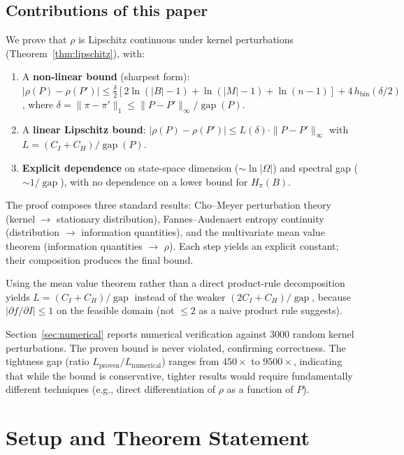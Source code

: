 \documentclass[11pt,a4paper]{article}
\DeclareMathOperator{\gap}{gap}
\begin{document}
\subsection{Contributions of this paper}

We prove that $\rho$ is Lipschitz continuous under kernel perturbations
(Theorem~\ref{thm:lipschitz}), with:
\begin{enumerate}
  \item A \textbf{non-linear bound} (sharpest form):
    $|\rho(P) - \rho(P')| \le
    \frac{\delta}{2}[2\ln(|B|-1) + \ln(|M|-1) + \ln(n-1)]
    + 4\,h_{\mathrm{bin}}(\delta/2)$,
    where $\delta = \|\pi - \pi'\|_1 \le \|P-P'\|_\infty/\gap(P)$.
  \item A \textbf{linear Lipschitz bound}:
    $|\rho(P) - \rho(P')| \le L(\delta)\cdot\|P-P'\|_\infty$
    with $L = (C_I + C_H)/\gap(P)$.
  \item \textbf{Explicit dependence} on state-space dimension
    ($\sim\ln|\Omega|$) and spectral gap ($\sim 1/\gap$), with
    no dependence on a lower bound for $H_\pi(B)$.
\end{enumerate}

The proof composes three standard results: Cho--Meyer perturbation
theory~\cite{ChoMeyer2001} (kernel $\to$ stationary distribution),
Fannes--Audenaert entropy continuity~\cite{Audenaert2007} (distribution
$\to$ information quantities), and the multivariate mean value theorem
(information quantities $\to$ $\rho$).  Each step yields an explicit
constant; their composition produces the final bound.

Using the mean value theorem rather than a direct product-rule
decomposition yields $L = (C_I + C_H)/\gap$ instead of the weaker
$(2C_I + C_H)/\gap$, because $|\partial f/\partial I| \le 1$ on the
feasible domain (not $\le 2$ as a naive product rule suggests).

Section~\ref{sec:numerical} reports numerical verification against
3000 random kernel perturbations.  The proven bound is never violated,
confirming correctness.  The tightness gap (ratio $L_{\mathrm{proven}}/
L_{\mathrm{numerical}}$) ranges from $450\times$ to $9500\times$,
indicating that while the bound is conservative, tighter results would
require fundamentally different techniques (e.g., direct differentiation
of $\rho$ as a function of $P$).


\section{Setup and Theorem Statement}\label{sec:setup}
\end{document}
